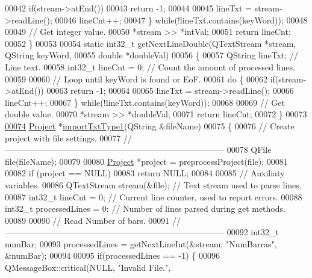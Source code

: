 \begin{DoxyCode}
00042     \textcolor{keywordflow}{if}(stream->atEnd())
00043       \textcolor{keywordflow}{return} -1;
00044 
00045     lineTxt = stream->readLine();
00046     lineCnt++;
00047   \} \textcolor{keywordflow}{while}(!lineTxt.contains(keyWord));
00048 
00049   \textcolor{comment}{// Get integer value.}
00050   *stream >> *intVal;
00051   \textcolor{keywordflow}{return} lineCnt;
00052 \}
00053 
00054 \textcolor{keyword}{static} int32\_t getNextLineDouble(QTextStream *stream, QString keyWord,
00055                                  \textcolor{keywordtype}{double} *doubleVal)
00056 \{
00057   QString lineTxt; \textcolor{comment}{// Line text.}
00058   int32\_t lineCnt = 0; \textcolor{comment}{// Count the amount of processed lines.}
00059 
00060   \textcolor{comment}{// Loop until keyWord is found or EoF.}
00061   \textcolor{keywordflow}{do} \{
00062     \textcolor{keywordflow}{if}(stream->atEnd())
00063       \textcolor{keywordflow}{return} -1;
00064 
00065     lineTxt = stream->readLine();
00066     lineCnt++;
00067   \} \textcolor{keywordflow}{while}(!lineTxt.contains(keyWord));
00068 
00069   \textcolor{comment}{// Get double value.}
00070   *stream >> *doubleVal;
00071   \textcolor{keywordflow}{return} lineCnt;
00072 \}
00073 
\hypertarget{import_8cpp_source_l00074}{}\hyperlink{import_8h_a67dd59b2afe82bc7272ad6dfd3bed633}{00074} \hyperlink{class_project}{Project} *\hyperlink{import_8cpp_a67dd59b2afe82bc7272ad6dfd3bed633}{importTxtType1}(QString &fileName)
00075 \{
00076 \textcolor{comment}{// Create project with file settings.}
00077 \textcolor{comment}{//------------------------------------------------------------------------------}
00078   QFile file(fileName);
00079 
00080   \hyperlink{class_project}{Project} *project = preprocessProject(file);
00081 
00082   \textcolor{keywordflow}{if} (project == NULL)
00083     \textcolor{keywordflow}{return} NULL;
00084 
00085   \textcolor{comment}{// Auxiliaty variables.}
00086   QTextStream stream(&file); \textcolor{comment}{// Text stream used to parse lines.}
00087   int32\_t lineCnt = 0; \textcolor{comment}{// Current line counter, used to report errors.}
00088   int32\_t processedLines = 0; \textcolor{comment}{// Number of lines parsed during get methods.}
00089 
00090 \textcolor{comment}{// Read Number of bars.}
00091 \textcolor{comment}{//------------------------------------------------------------------------------}
00092   int32\_t numBar;
00093   processedLines = getNextLineInt(&stream, \textcolor{stringliteral}{"NumBarras"}, &numBar);
00094 
00095   \textcolor{keywordflow}{if}(processedLines == -1) \{
00096     QMessageBox::critical(NULL, \textcolor{stringliteral}{"Invalid File."},

\end{DoxyCode}
